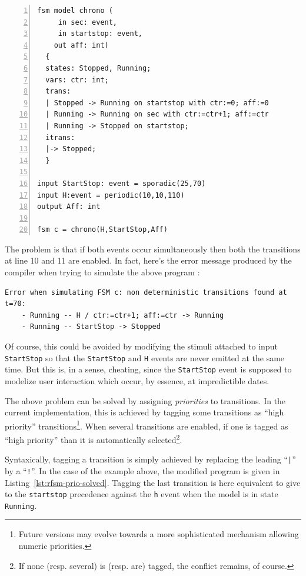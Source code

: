 \begin{lstlisting}[language=Rfsm,frame=single,numbers=left,caption=A program showing a potentially non-deterministic
  model,label={lst:rfsm-prio-pb},float]
fsm model chrono (
     in sec: event,
     in startstop: event,
    out aff: int)
  {
  states: Stopped, Running;
  vars: ctr: int;
  trans:
  | Stopped -> Running on startstop with ctr:=0; aff:=0
  | Running -> Running on sec with ctr:=ctr+1; aff:=ctr
  | Running -> Stopped on startstop;
  itrans:
  |-> Stopped;
  }

input StartStop: event = sporadic(25,70)
input H:event = periodic(10,10,110)
output Aff: int

fsm c = chrono(H,StartStop,Aff)
\end{lstlisting}

The problem is that if both events occur simultaneously  then
both the transitions at line 10 and 11 are enabled. In fact, here's the error message produced by
the compiler when trying to simulate the above program :

\small
\begin{verbatim}
Error when simulating FSM c: non deterministic transitions found at t=70:
	- Running -- H / ctr:=ctr+1; aff:=ctr -> Running
	- Running -- StartStop -> Stopped
\end{verbatim}
\normalsize

Of course, this could be avoided by modifying the stimuli attached to input \verb|StartStop| so that
the \texttt{StartStop} and \texttt{H} events are never emitted at the same time. But this is, in a
sense, cheating, since the \texttt{StartStop} event is supposed to modelize user interaction which
occur, by essence, at impredictible dates.

The above problem can be solved by assigning \emph{priorities} to transitions. In the current
implementation, this is achieved by tagging some transitions as ``high priority''
transitions\footnote{Future versions may evolve towards a more sophisticated mechanism allowing
  numeric priorities.}.  When several transitions are enabled, if one is tagged as ``high priority''
than it is automatically selected\footnote{If none (resp. several) is (resp. are) tagged, the
  conflict remains, of course.}. 

Syntaxically, tagging a transition is simply achieved by replacing the leading ``\verb+|+'' by a
``\verb|!|''.  In the
case of the example above, the modified program is given in
Listing~\ref{lst:rfsm-prio-solved}. Tagging the last transition is here equivalent to give to the
\verb|startstop| precedence against the \verb|h| event when the model is in state
\verb|Running|.

